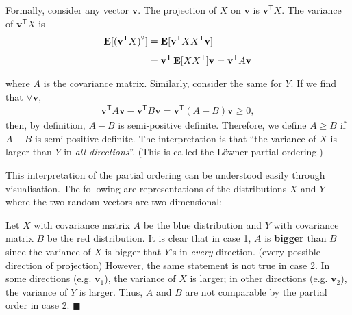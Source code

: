 \documentclass{article}
\DeclareMathOperator{\Exp}{\text{\textbf{E}}}
\newcommand{\E}[2][]{\Exp_{#1}[#2]}
\newcommand{\asDemonstrated}{\null\nobreak\hfill\ensuremath{\blacksquare}}
\newcommand{\T}{^{\mathsf{T}}}
\newcommand{\vv}{\mathbf{v}}
\begin{document}
\begin{multicols}{2}
Formally, consider any vector $\vv$.
The projection of $X$ on $\vv$ is $\vv\T X$.
The variance of $\vv\T X$ is 
\begin{align*}
	\E{(\vv\T X)^2}
	&= \E{\vv\T XX\T\vv} \\
	&= \vv\T\E{XX\T}\vv
	= \vv\T A\vv
\end{align*}
where $A$ is the covariance matrix.
Similarly, consider the same for $Y$.
If we find that $\forall\vv$,
\begin{align*}
	\vv\T A\vv - \vv\T B\vv
	= \vv\T (A - B)\vv
	\geq 0,
\end{align*}
then, by definition, $A-B$ is semi-positive definite.
Therefore, we define $A\geq B$ if $A-B$ is semi-positive definite.
The interpretation is that
``the variance of $X$ is larger than $Y$ in \emph{all directions}''.
(This is called the L\"{o}wner partial ordering.)

This interpretation of the partial ordering can be understood easily through visualisation.
The following are representations of the distributions $X$ and $Y$ where the
two random vectors are two-dimensional:
\begin{center}
	
\end{center}
Let $X$ with covariance matrix $A$ be the blue distribution and $Y$ with
covariance matrix $B$ be the red distribution.
It is clear that in case 1, $A$ is \textbf{bigger} than $B$ since the variance of $X$ is
bigger that $Y$'s in \emph{every} direction. (every possible direction of projection)
However, the same statement is not true in case 2.
In some directions (e.g.\! $\vv_1$), the variance of $X$ is larger;
in other directions (e.g.\! $\vv_2$), the variance of $Y$ is larger.
Thus, $A$ and $B$ are not comparable by the partial order in case 2.
\asDemonstrated

\end{multicols}
\end{document}

